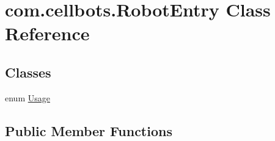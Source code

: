 \hypertarget{classcom_1_1cellbots_1_1_robot_entry}{\section{com.\-cellbots.\-Robot\-Entry Class Reference}
\label{classcom_1_1cellbots_1_1_robot_entry}
}
\subsection*{Classes}
\begin{DoxyCompactItemize}
\item 
enum \hyperlink{enumcom_1_1cellbots_1_1_robot_entry_1_1_usage}{Usage}
\end{DoxyCompactItemize}
\subsection*{Public Member Functions}
